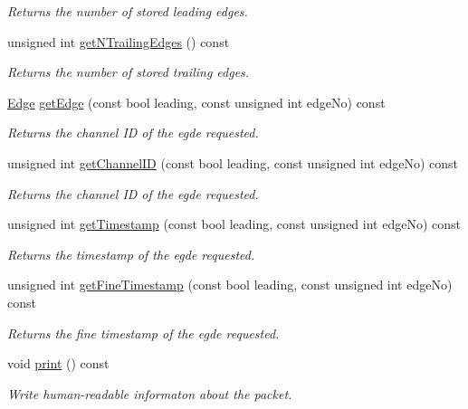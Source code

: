 \begin{DoxyCompactItemize}
\begin{DoxyCompactList}\small\item\em Returns the number of stored leading edges. \end{DoxyCompactList}\item 
unsigned int \hyperlink{class_packet_aed7b21042c14e00546a2f4600d3b57d1}{get\+N\+Trailing\+Edges} () const
\begin{DoxyCompactList}\small\item\em Returns the number of stored trailing edges. \end{DoxyCompactList}\item 
\hyperlink{class_edge}{Edge} \hyperlink{class_packet_a457fdd6c0e5cdb161a77550203504e6d}{get\+Edge} (const bool leading, const unsigned int edge\+No) const
\begin{DoxyCompactList}\small\item\em Returns the channel ID of the egde requested. \end{DoxyCompactList}\item 
unsigned int \hyperlink{class_packet_a8a767973ff4b30b417716bbb071ccf33}{get\+Channel\+ID} (const bool leading, const unsigned int edge\+No) const
\begin{DoxyCompactList}\small\item\em Returns the channel ID of the egde requested. \end{DoxyCompactList}\item 
unsigned int \hyperlink{class_packet_a7a15b0965a125dd8441297007581c637}{get\+Timestamp} (const bool leading, const unsigned int edge\+No) const
\begin{DoxyCompactList}\small\item\em Returns the timestamp of the egde requested. \end{DoxyCompactList}\item 
unsigned int \hyperlink{class_packet_aafbf1d7b7303ef5f3919e7ed9f8065f8}{get\+Fine\+Timestamp} (const bool leading, const unsigned int edge\+No) const
\begin{DoxyCompactList}\small\item\em Returns the fine timestamp of the egde requested. \end{DoxyCompactList}\item 
void \hyperlink{class_packet_aec87fc2f2473111a694ad8b6f60e7666}{print} () const
\begin{DoxyCompactList}\small\item\em Write human-\/readable informaton about the packet. \end{DoxyCompactList}\end{DoxyCompactItemize}
